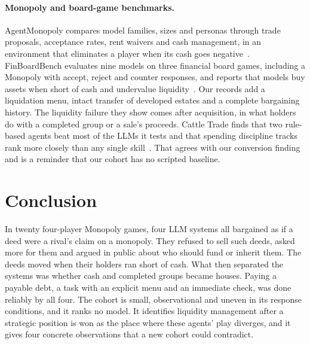 \paragraph{Monopoly and board-game benchmarks.} AgentMonopoly compares model families, sizes and personas through trade proposals, acceptance rates, rent waivers and cash management, in an environment that eliminates a player when its cash goes negative~\cite{wu2026agentmonopoly}. FinBoardBench evaluates nine models on three financial board games, including a Monopoly with accept, reject and counter responses, and reports that models buy assets when short of cash and undervalue liquidity~\cite{hu2026finboardbench}. Our records add a liquidation menu, intact transfer of developed estates and a complete bargaining history. The liquidity failure they show comes after acquisition, in what holders do with a completed group or a sale's proceeds. Cattle Trade finds that two rule-based agents beat most of the LLMs it tests and that spending discipline tracks rank more closely than any single skill~\cite{muller2026cattletrade}. That agrees with our conversion finding and is a reminder that our cohort has no scripted baseline.

\section{Conclusion}

In twenty four-player Monopoly games, four LLM systems all bargained as if a deed were a rival's claim on a monopoly. They refused to sell such deeds, asked more for them and argued in public about who should fund or inherit them. The deeds moved when their holders ran short of cash. What then separated the systems was whether cash and completed groups became houses. Paying a payable debt, a task with an explicit menu and an immediate check, was done reliably by all four. The cohort is small, observational and uneven in its response conditions, and it ranks no model. It identifies liquidity management after a strategic position is won as the place where these agents' play diverges, and it gives four concrete observations that a new cohort could contradict.
